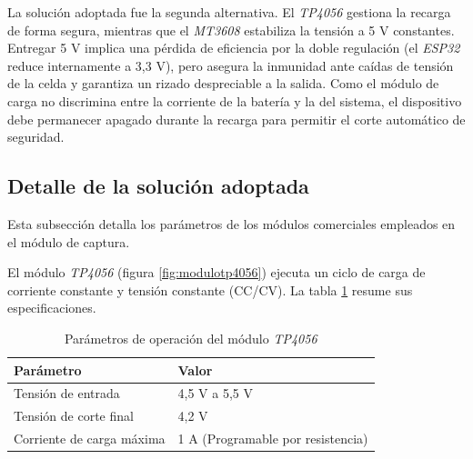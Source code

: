 La solución adoptada fue la segunda alternativa. El \emph{TP4056} gestiona la recarga de forma segura, mientras que el \emph{MT3608} estabiliza la tensión a 5 V constantes. Entregar 5 V implica una pérdida de eficiencia por la doble regulación (el \emph{ESP32} reduce internamente a 3,3 V), pero asegura la inmunidad ante caídas de tensión de la celda y garantiza un rizado despreciable a la salida. Como el módulo de carga no discrimina entre la corriente de la batería y la del sistema, el dispositivo debe permanecer apagado durante la recarga para permitir el corte automático de seguridad.

\subsection{Detalle de la solución adoptada}

Esta subsección detalla los parámetros de los módulos comerciales empleados en el módulo de captura. 

El módulo \emph{TP4056} (figura \ref{fig:modulotp4056}) ejecuta un ciclo de carga de corriente constante y tensión constante (CC/CV). La tabla \ref{tab:parametros_tp4056} resume sus especificaciones.

\begin{table}[H]
    \centering
    \caption{Parámetros de operación del módulo \emph{TP4056}}
    \label{tab:parametros_tp4056}
    \begin{tabular}{|l|l|}
        \hline
        \textbf{Parámetro} & \textbf{Valor} \\
        \hline
        Tensión de entrada & 4,5 V a 5,5 V \\
        \hline
        Tensión de corte final & 4,2 V \\
        \hline
        Corriente de carga máxima & 1 A (Programable por resistencia) \\
        \hline
    \end{tabular}
\end{table}

